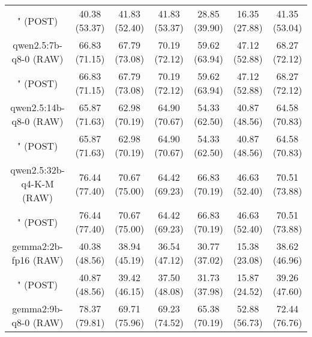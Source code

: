 \begin{table}[]
{\begin{tabular}{ccccccc}
      \multicolumn{1}{c|}{" (POST)} & 40.38 (53.37) & 41.83 (52.40) & \multicolumn{1}{c|}{41.83 (53.37)} & 28.85 (39.90) & \multicolumn{1}{c|}{16.35 (27.88)} & 41.35 (53.04) \\
      \cline{1-7}

      \multicolumn{1}{c|}{qwen2.5:7b-q8-0 (RAW)} & 66.83 (71.15) & 67.79 (73.08) & \multicolumn{1}{c|}{70.19 (72.12)} & 59.62 (63.94) & \multicolumn{1}{c|}{47.12 (52.88)} & 68.27 (72.12) \\

      \multicolumn{1}{c|}{" (POST)} & 66.83 (71.15) & 67.79 (73.08) & \multicolumn{1}{c|}{70.19 (72.12)} & 59.62 (63.94) & \multicolumn{1}{c|}{47.12 (52.88)} & 68.27 (72.12) \\
      \cline{1-7}

      \multicolumn{1}{c|}{qwen2.5:14b-q8-0 (RAW)} & 65.87 (71.63) & 62.98 (70.19) & \multicolumn{1}{c|}{64.90 (70.67)} & 54.33 (62.50) & \multicolumn{1}{c|}{40.87 (48.56)} & 64.58 (70.83) \\

      \multicolumn{1}{c|}{" (POST)} & 65.87 (71.63) & 62.98 (70.19) & \multicolumn{1}{c|}{64.90 (70.67)} & 54.33 (62.50) & \multicolumn{1}{c|}{40.87 (48.56)} & 64.58 (70.83) \\
      \cline{1-7}

      \multicolumn{1}{c|}{qwen2.5:32b-q4-K-M (RAW)} & 76.44 (77.40) & 70.67 (75.00) & \multicolumn{1}{c|}{64.42 (69.23)} & 66.83 (70.19) & \multicolumn{1}{c|}{46.63 (52.40)} & 70.51 (73.88) \\

      \multicolumn{1}{c|}{" (POST)} & 76.44 (77.40) & 70.67 (75.00) & \multicolumn{1}{c|}{64.42 (69.23)} & 66.83 (70.19) & \multicolumn{1}{c|}{46.63 (52.40)} & 70.51 (73.88) \\
      \cline{1-7}

      \multicolumn{1}{c|}{gemma2:2b-fp16 (RAW)} & 40.38 (48.56) & 38.94 (45.19) & \multicolumn{1}{c|}{36.54 (47.12)} & 30.77 (37.02) & \multicolumn{1}{c|}{15.38 (23.08)} & 38.62 (46.96) \\

      \multicolumn{1}{c|}{" (POST)} & 40.87 (48.56) & 39.42 (46.15) & \multicolumn{1}{c|}{37.50 (48.08)} & 31.73 (37.98) & \multicolumn{1}{c|}{15.87 (24.52)} & 39.26 (47.60) \\
      \cline{1-7}

      \multicolumn{1}{c|}{gemma2:9b-q8-0 (RAW)} & 78.37 (79.81) & 69.71 (75.96) & \multicolumn{1}{c|}{69.23 (74.52)} & 65.38 (70.19) & \multicolumn{1}{c|}{52.88 (56.73)} & 72.44 (76.76) \\


\end{tabular}}
\end{table}
